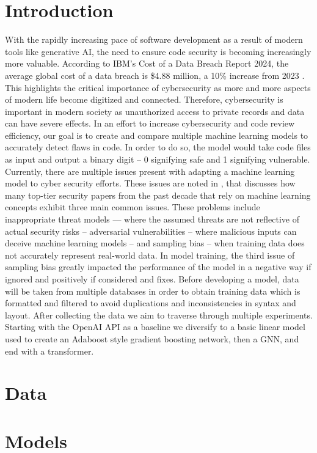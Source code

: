 \documentclass{article}
\begin{document}
\section{Introduction}
With the rapidly increasing pace of software development as a result of modern tools like generative AI,
the need to ensure code security is becoming increasingly more valuable. According to IBM's Cost of a
Data Breach Report 2024, the average global cost of a data breach is \$4.88 million, a 10\% increase from
2023 \cite{ibm2024cost}. This highlights the critical importance of cybersecurity as more and more aspects of modern life become
digitized and connected. Therefore, cybersecurity is important in modern society as unauthorized access to
private records and data can have severe effects. In an effort to increase cybersecurity and code review
efficiency, our goal is to create and compare multiple machine learning models to accurately detect flaws in code. In order to
do so, the model would take code files as input and output a binary digit -- 0 signifying safe and 1 signifying vulnerable. Currently, there are multiple issues present with adapting a machine
learning model to cyber security efforts. These issues are noted in \cite{Arp2024}, that discusses how many top-tier security papers
from the past decade that rely on machine learning concepts exhibit three main common issues. These problems include inappropriate threat
models — where the assumed threats are not reflective of actual security risks – adversarial vulnerabilities
– where malicious inputs can deceive machine learning models – and sampling bias – when training data does
not accurately represent real-world data. In model training, the third issue of sampling bias greatly impacted the performance
of the model in a negative way if ignored and positively if considered and fixes. Before developing a model, data will be taken 
from multiple databases in order to obtain training data which is formatted and filtered to avoid duplications and inconsistencies
in syntax and layout. After collecting the data we aim to traverse through multiple experiments. Starting with the OpenAI API as
a baseline we diversify to a basic linear model used to create an Adaboost style gradient boosting network, then a GNN, and end with a transformer.

\section{Data}

\section*{Models}
\end{document}
